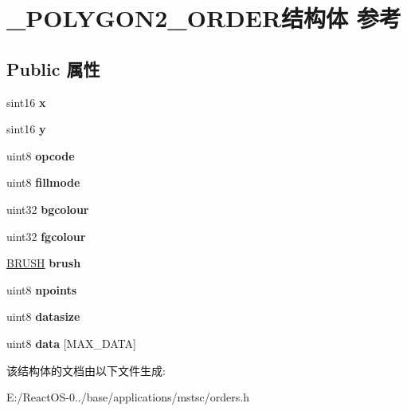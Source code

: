 \hypertarget{struct___p_o_l_y_g_o_n2___o_r_d_e_r}{}\section{\+\_\+\+P\+O\+L\+Y\+G\+O\+N2\+\_\+\+O\+R\+D\+E\+R结构体 参考}
\label{struct___p_o_l_y_g_o_n2___o_r_d_e_r}
\subsection*{Public 属性}
\begin{DoxyCompactItemize}
\item 
\mbox{\label{struct___p_o_l_y_g_o_n2___o_r_d_e_r_ae471adbefff21710e5fe2f3d43861969}} 
sint16 {\bfseries x}
\item 
\mbox{\label{struct___p_o_l_y_g_o_n2___o_r_d_e_r_a1bb7599b46a55e7d44742397da2ebdac}} 
sint16 {\bfseries y}
\item 
\mbox{\label{struct___p_o_l_y_g_o_n2___o_r_d_e_r_abee04c8de7e91ef6a44bfc907b13a4e3}} 
uint8 {\bfseries opcode}
\item 
\mbox{\label{struct___p_o_l_y_g_o_n2___o_r_d_e_r_a4e057ae638e8f7486a44600419a01f4b}} 
uint8 {\bfseries fillmode}
\item 
\mbox{\label{struct___p_o_l_y_g_o_n2___o_r_d_e_r_a5c31167c47092174b8af5ea9304af4ed}} 
uint32 {\bfseries bgcolour}
\item 
\mbox{\label{struct___p_o_l_y_g_o_n2___o_r_d_e_r_af1156259cebfa0fbc0369d3ce4d0ced8}} 
uint32 {\bfseries fgcolour}
\item 
\mbox{\label{struct___p_o_l_y_g_o_n2___o_r_d_e_r_ab6a4886b5e87d69ca4a3f5c376571a34}} 
\hyperlink{class_b_r_u_s_h}{B\+R\+U\+SH} {\bfseries brush}
\item 
\mbox{\label{struct___p_o_l_y_g_o_n2___o_r_d_e_r_a3e5d21b9a719b36aaa6f8e0dcee9b26d}} 
uint8 {\bfseries npoints}
\item 
\mbox{\label{struct___p_o_l_y_g_o_n2___o_r_d_e_r_af04bfc320dc8cd6b55efa3f3bd414cda}} 
uint8 {\bfseries datasize}
\item 
\mbox{\label{struct___p_o_l_y_g_o_n2___o_r_d_e_r_ad6ae6491f851c9f66e0f081d0de20eeb}} 
uint8 {\bfseries data} \mbox{[}M\+A\+X\+\_\+\+D\+A\+TA\mbox{]}
\end{DoxyCompactItemize}


该结构体的文档由以下文件生成\+:\begin{DoxyCompactItemize}
\item 
E\+:/\+React\+O\+S-\/0../base/applications/mstsc/orders.\+h\end{DoxyCompactItemize}
